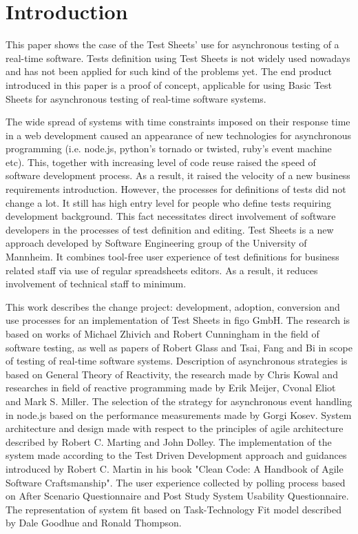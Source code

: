 \chapter{Introduction}
\label{chap:intro}
This paper shows the case of the Test Sheets' use for asynchronous testing of a real-time software. Tests definition using Test Sheets is not widely used nowadays and has not been applied for such kind of the problems yet.
The end product introduced in this paper is a proof of concept,  applicable for using Basic Test Sheets for asynchronous testing of real-time software systems.

The wide spread of systems with time constraints imposed on their response time in a web development caused an appearance of new technologies for asynchronous programming (i.e. node.js, python's tornado or twisted, ruby's event machine etc). 
This, together with increasing level of code reuse raised the speed of software development process.
As a result, it raised the velocity of a new business requirements introduction.
However, the processes for definitions of tests did not change a lot. 
It still has high entry level for people who define tests requiring development background.
This fact necessitates direct involvement of software developers in the processes of test definition and editing.
Test Sheets is a new approach developed by Software Engineering group of the University of Mannheim. 
It combines  tool-free user experience of test definitions for business related staff via use of regular spreadsheets editors.
As a result, it reduces involvement of technical staff to minimum.


This work describes the change project: development, adoption, conversion and use processes for an implementation of Test Sheets in figo GmbH. The research is based on works of Michael Zhivich and Robert Cunningham in the field of software testing, as well as papers of Robert Glass and Tsai, Fang  and Bi in scope of testing of real-time software systems.
Description of asynchronous strategies is based on General Theory of Reactivity, the research made by Chris Kowal and researches in field of reactive programming made by Erik Meijer, Cvonal Eliot and Mark S. Miller. 
The selection of the strategy for asynchronous event handling in node.js based on the performance measurements made by Gorgi Kosev. 
System  architecture and design made with respect to the principles of agile architecture described by Robert  C. Marting and John Dolley. 
The implementation of the system made according to the Test Driven Development approach and guidances introduced by Robert C. Martin in his book "Clean Code: A Handbook of Agile Software Craftsmanship".
The user experience collected by polling process based on After Scenario Questionnaire and Post Study System Usability Questionnaire.
The representation of system fit based on Task-Technology Fit model described by Dale Goodhue and Ronald Thompson.

